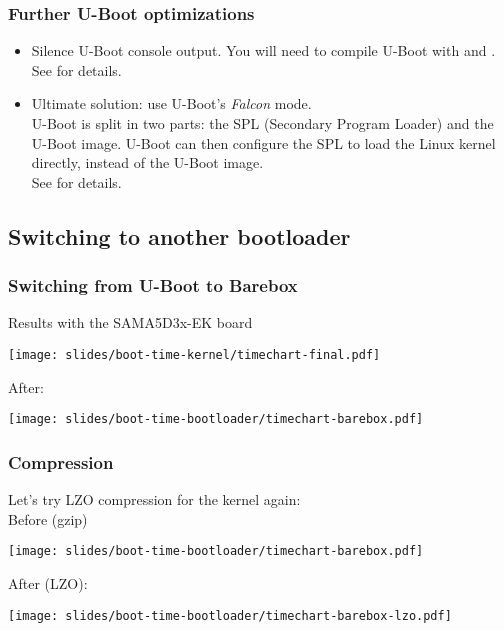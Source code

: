 \begin{frame}
\frametitle{Further U-Boot optimizations}
\begin{itemize}
\item Silence U-Boot console output. You will need to compile
      U-Boot with  and
      .\\
      See  for details.
\item Ultimate solution: use U-Boot's {\em Falcon} mode.\\
      U-Boot is split in two parts: the SPL (Secondary Program Loader)
      and the U-Boot image. U-Boot can then configure the SPL to load
      the Linux kernel directly, instead of the U-Boot image.\\
      See  for details.
\end{itemize}
\end{frame}

\subsection{Switching to another bootloader}

\begin{frame}
\frametitle{Switching from U-Boot to Barebox}
Results with the SAMA5D3x-EK board \\
\begin{center}
    \texttt{[image: slides/boot-time-kernel/timechart-final.pdf]}
\end{center}
After:
\begin{center}
    \texttt{[image: slides/boot-time-bootloader/timechart-barebox.pdf]}
\end{center}
\end{frame}

\begin{frame}
\frametitle{Compression}
Let's try LZO compression for the kernel again:\\
Before (gzip)
\begin{center}
    \texttt{[image: slides/boot-time-bootloader/timechart-barebox.pdf]}
\end{center}
After (LZO):
\begin{center}
    \texttt{[image: slides/boot-time-bootloader/timechart-barebox-lzo.pdf]}
\end{center}
\end{frame}

